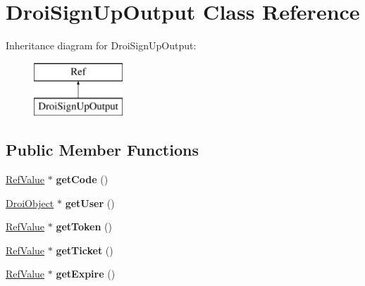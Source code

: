 \hypertarget{class_droi_sign_up_output}{}\section{Droi\+Sign\+Up\+Output Class Reference}
\label{class_droi_sign_up_output}
Inheritance diagram for Droi\+Sign\+Up\+Output\+:\begin{figure}[H]
\begin{center}
\leavevmode
\includegraphics[height=2.000000cm]{d8/dab/class_droi_sign_up_output}
\end{center}
\end{figure}
\subsection*{Public Member Functions}
\begin{DoxyCompactItemize}
\item 
\mbox{\label{class_droi_sign_up_output_a96b263b467207221e03b6275cbe44686}} 
\hyperlink{class_ref_value}{Ref\+Value} $\ast$ {\bfseries get\+Code} ()
\item 
\mbox{\label{class_droi_sign_up_output_a18a3980cd65f0adab7e432cf5ca4c67e}} 
\hyperlink{class_droi_object}{Droi\+Object} $\ast$ {\bfseries get\+User} ()
\item 
\mbox{\label{class_droi_sign_up_output_ad6580ca0dcf55d1d9ffebe9eb4b3e8b8}} 
\hyperlink{class_ref_value}{Ref\+Value} $\ast$ {\bfseries get\+Token} ()
\item 
\mbox{\label{class_droi_sign_up_output_adff2279eb6c2080f12dd0fce22029eb1}} 
\hyperlink{class_ref_value}{Ref\+Value} $\ast$ {\bfseries get\+Ticket} ()
\item 
\mbox{\label{class_droi_sign_up_output_a8d5443cede8f67b8e69c4ddd26818d5e}} 
\hyperlink{class_ref_value}{Ref\+Value} $\ast$ {\bfseries get\+Expire} ()
\end{DoxyCompactItemize}
